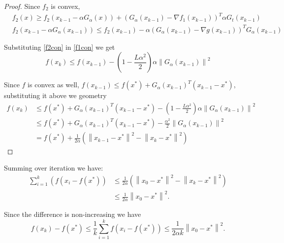 \documentclass[12pt]{article}
\theoremstyle{mystyle}
\begin{document}
\begin{proof}
Since $f_2$ is convex, 
\begin{equation}\label{f2con}
    \begin{aligned}
    & f_2(x) \geq f_2\left(x_{k-1} - \alpha G_\alpha (x)\right)+\left(G_\alpha(x_{k-1})-\nabla f_1(x_{k-1})\right)^T \alpha G_t(x_{k-1}) \\
    & f_2\left(x_{k-1}- \alpha G_\alpha (x_{k-1})\right) \leq f_2(x_{k-1})-\alpha \left(G_\alpha (x_{k-1})-\nabla g(x_{k-1})\right)^T G_\alpha(x_{k-1})
    \end{aligned}
    \end{equation}

Substituting \eqref{f2con} in \eqref{f1con} we get
\begin{equation*}
    f(x_k) \leq f(x_{k-1}) - (1 - \frac{L \alpha^2}{2})\alpha \left\|G_\alpha(x_{k-1}) \right\|^2 
\end{equation*}

Since $f$ is convex as well, $f(x_{k-1}) \leq f\left(x^*\right)+G_\alpha (x_{k-1})^T\left(x_{k-1}-x^*\right)$, substituting it above we geometry
\begin{align*}
    f(x_k) &\leq f\left(x^*\right)+G_\alpha (x_{k-1})^T\left(x_{k-1}-x^*\right) - (1 - \frac{L \alpha^2}{2})\alpha \left\|G_\alpha(x_{k-1}) \right\|^2 \\
    &\leq f\left(x^*\right)+G_\alpha (x_{k-1})^T\left(x_{k-1}-x^*\right) -  \frac{ \alpha^2}{2} \left\|G_\alpha(x_{k-1}) \right\|^2\\
    &= f\left(x^*\right)+ \frac{1}{2\alpha} (\left\|x_{k-1} - x^* \right\|^2 - \left\|x_k - x^* \right\|^2 )
\end{align*}
\end{proof}

Summing over iteration we have:
\begin{equation}
    \begin{aligned}
    \sum_{i=1}^k\left(f\left(x_i-f\left(x^*\right)\right)\right. & \leq \frac{1}{2 \alpha}\left(\left\|x_0-x^*\right\|^2-\left\|x_k-x^*\right\|^2\right) \\
    & \leq \frac{1}{2 \alpha}\left\|x_0-x^*\right\|^2.
    \end{aligned}
    \end{equation}

Since the difference is non-increasing we have
\begin{equation}
f\left(x_k\right)-f\left(x^*\right) \leq \frac{1}{k} \sum_{i=1}^k f(x_i-f\left(x^*\right) ) \leq \frac{1}{2 \alpha k}\left\|x_0-x^*\right\|^2.
\end{equation}
\end{document}
